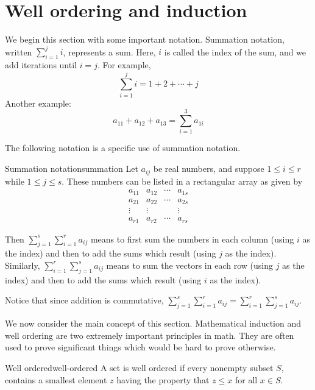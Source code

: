\section{Well ordering and induction}

\label{well-ordering-section}

We begin this section with some important notation. Summation notation, written $\sum_{i=1}^{j} i$, represents a sum. Here, $i$ is called the index of the sum, and we add iterations until $i=j$. For example, 
\[
\sum_{i=1}^{j} i = 1 + 2 + \cdots + j 
\]
Another example: 
\[
a_{11} + a_{12} + a_{13}  = \sum_{i=1}^{3} a_{1i}
\]

The following notation is a specific use of summation notation. 

\begin{notation}{Summation notation}{summation}
Let $a_{ij}$ be real numbers, and suppose  $1\leq i\leq r$ while $
1\leq j\leq s$. These numbers can be listed in a rectangular array as given by 
\begin{equation*}
\begin{array}{cccc}
a_{11} & a_{12} & \cdots & a_{1s} \\ 
a_{21} & a_{22} & \cdots & a_{2s} \\ 
\vdots & \vdots &  & \vdots \\ 
a_{r1} & a_{r2} & \cdots & a_{rs}
\end{array}
\end{equation*}

Then $\sum_{j=1}^{s}\sum_{i=1}^{r} a_{ij}$ means to first sum the numbers
in each column (using $i$ as the index) and then to add the sums which result (using $j$ as the index). Similarly,  
$\sum_{i=1}^{r}\sum_{j=1}^{s} a_{ij}$ means to sum the vectors in
each row (using $j$ as the index) and then to add the sums which result (using $i$ as the index). 
\end{notation}

Notice that since addition is commutative, $\sum_{j=1}^{s}\sum_{i=1}^{r} a_{ij} = \sum_{i=1}^{r}\sum_{j=1}^{s} a_{ij}$. 

We now consider the main concept of this section. Mathematical induction and well ordering are two extremely important
principles in math. They are often used to prove significant things which
would be hard to prove otherwise.

\begin{definition}{Well ordered}{well-ordered}
 A set is well ordered if every nonempty subset $S$, contains a
smallest element $z$ having the property that $z\leq x$ for all $x\in S$.
\end{definition}

